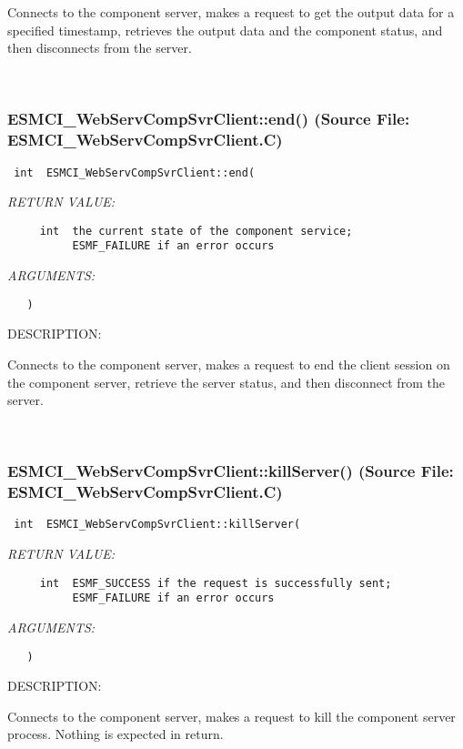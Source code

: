       Connects to the component server, makes a request to get the output data
      for a specified timestamp, retrieves the output data and the component
      status, and then disconnects from the server.
   
 
\mbox{}\hrulefill\
 
\subsubsection{ESMCI\_WebServCompSvrClient::end() (Source File: ESMCI\_WebServCompSvrClient.C)}


  
\begin{verbatim} int  ESMCI_WebServCompSvrClient::end(\end{verbatim}{\em RETURN VALUE:}
\begin{verbatim}     int  the current state of the component service;
          ESMF_FAILURE if an error occurs\end{verbatim}{\em ARGUMENTS:}
\begin{verbatim}   )\end{verbatim}
{\sf DESCRIPTION:\\ }


      Connects to the component server, makes a request to end the client
      session on the component server, retrieve the server status, and then
      disconnect from the server.
   
 
\mbox{}\hrulefill\
 
\subsubsection{ESMCI\_WebServCompSvrClient::killServer() (Source File: ESMCI\_WebServCompSvrClient.C)}


  
\begin{verbatim} int  ESMCI_WebServCompSvrClient::killServer(\end{verbatim}{\em RETURN VALUE:}
\begin{verbatim}     int  ESMF_SUCCESS if the request is successfully sent;
          ESMF_FAILURE if an error occurs\end{verbatim}{\em ARGUMENTS:}
\begin{verbatim}   )\end{verbatim}
{\sf DESCRIPTION:\\ }


      Connects to the component server, makes a request to kill the component
      server process.  Nothing is expected in return.
  
\setlength{\parskip}{\oldparskip}
\setlength{\parindent}{\oldparindent}
\setlength{\baselineskip}{\oldbaselineskip}
